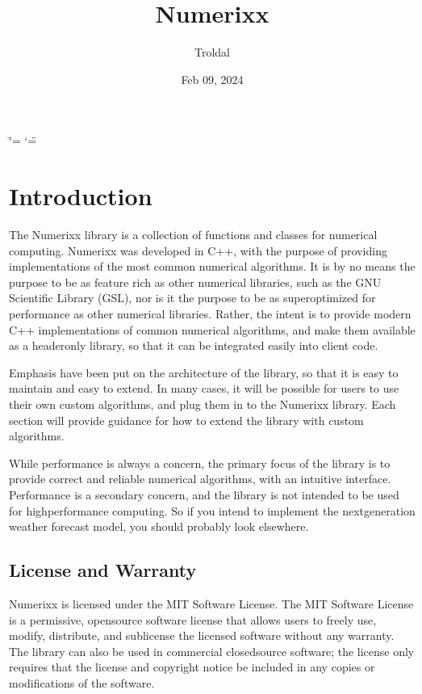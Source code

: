 \documentclass[letterpaper,10pt,english]{sphinxmanual}
\title{Numerixx}
\date{Feb 09, 2024}
\author{Troldal}
\begin{document}
\ifdefined\shorthandoff
  \ifnum\catcode`\=\string=\active\shorthandoff{=}\fi
  \ifnum\catcode`\"=\active{}\fi
\fi

\pagestyle{empty}
\sphinxmaketitle
\pagestyle{plain}
\sphinxtableofcontents
\pagestyle{normal}
\label{\detokenize{index::doc}}


\sphinxstepscope


\chapter{Introduction}
\label{\detokenize{docIntro:introduction}}\label{\detokenize{docIntro::doc}}
\sphinxAtStartPar
The Numerixx library is a collection of functions and classes for numerical computing. Numerixx was developed in C++, with the purpose of providing implementations of the most common numerical algorithms. It is by no means the purpose to be as feature rich as other numerical libraries, such as the GNU Scientific Library (GSL), nor is it the purpose to be as super\sphinxhyphen{}optimized for performance as other numerical libraries. Rather, the intent is to provide modern C++ implementations of common numerical algorithms, and make them available as a header\sphinxhyphen{}only library, so that it can be integrated easily into client code.

\sphinxAtStartPar
Emphasis have been put on the architecture of the library, so that it is easy to maintain and easy to extend. In many cases, it will be possible for users to use their own custom algorithms, and plug them in to the Numerixx library. Each section will provide guidance for how to extend the library with custom algorithms.

\sphinxAtStartPar
While performance is always a concern, the primary focus of the library is to provide correct and reliable numerical algorithms, with an intuitive interface. Performance is a secondary concern, and the library is not intended to be used for high\sphinxhyphen{}performance computing. So if you intend to implement the next\sphinxhyphen{}generation weather forecast model, you should probably look elsewhere.


\section{License and Warranty}
\label{\detokenize{docIntro:license-and-warranty}}
\sphinxAtStartPar
Numerixx is licensed under the MIT Software License. The MIT Software License is a permissive, open\sphinxhyphen{}source software license that allows users to freely use, modify, distribute, and sublicense the licensed software without any warranty. The library can also be used in commercial closed\sphinxhyphen{}source software; the license only requires that the license and copyright notice be included in any copies or modifications of the software.
\end{document}
